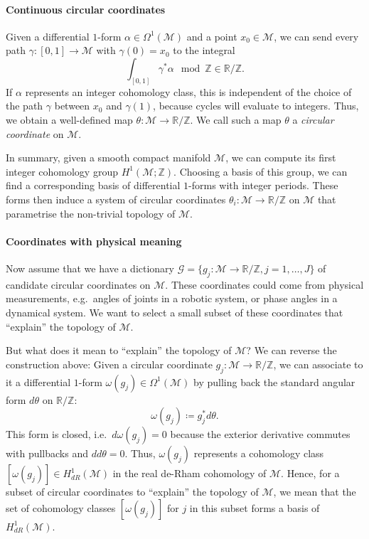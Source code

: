 \documentclass[a4paper,11pt, DIV=10]{scrartcl}
\numberwithin{equation}{section}
\theoremstyle{definition}
\theoremstyle{remark}
\newcommand{\Z}{\mathbb{Z}}
\newcommand{\R}{\mathbb{R}}
\newcommand{\mc}[1]{\mathcal{#1}}
\begin{document}
	\paragraph{Continuous circular coordinates}
	Given a differential $1$-form $\alpha\in \Omega^1(\mc{M})$ and a point $x_0\in \mc{M}$, we can send every path $\gamma\colon [0,1]\to \mc{M}$ with $\gamma(0)=x_0$ to the integral
		\begin{equation}
		\int_{[0,1]} \gamma^*\alpha \mod \Z \in \R/\Z.
		\end{equation}
	If $\alpha$ represents an integer cohomology class, this is independent of the choice of the path $\gamma$ between $x_0$ and $\gamma(1)$, because cycles will evaluate to integers.
	Thus, we obtain a well-defined map $\theta\colon \mc{M}\to \R/\Z$.
	We call such a map $\theta$ a \emph{circular coordinate} on $\mc{M}$.
	
	In summary, given a smooth compact manifold $\mc{M}$, we can compute its first integer cohomology group $H^1(\mc{M};\Z)$.
	Choosing a basis of this group, we can find a corresponding basis of differential $1$-forms with integer periods.
	These forms then induce a system of  circular coordinates $\theta_i\colon \mc{M}\to \R/\Z$ on $\mc{M}$ that parametrise the non-trivial topology of $\mc{M}$.

	\paragraph{Coordinates with physical meaning}

	Now assume that we have a dictionary $\mathcal{G}=\{g_j\colon \mc{M}\to \R/\Z, j=1,\dots, J\}$ of candidate circular coordinates on $\mc{M}$.
	These coordinates could come from physical measurements, e.g.\ angles of joints in a robotic system, or phase angles in a dynamical system.
	We want to select a small subset of these coordinates that \enquote{explain} the topology of $\mc{M}$.
	
	But what does it mean to \enquote{explain} the topology of $\mc{M}$?
	We can reverse the construction above:
	Given a circular coordinate $g_j\colon \mc{M}\to \R/\Z$, we can associate to it a differential $1$-form $\omega (g_j)\in \Omega^1(\mc{M})$ by pulling back the standard angular form $d\theta$ on $\R/\Z$:
		\begin{equation}
		\omega (g_j) \coloneq g_j^* d\theta.
		\end{equation}
	This form is closed, i.e.\ $d\omega (g_j)=0$ because the exterior derivative commutes with pullbacks and $dd\theta=0$.
	Thus, $\omega (g_j)$ represents a cohomology class $[\omega (g_j)]\in H^1_{dR}(\mc{M})$ in the real de-Rham cohomology of $\mc{M}$.
	Hence, for a subset of circular coordinates to \enquote{explain} the topology of $\mc{M}$, we mean that the set of cohomology classes $[\omega (g_j)]$ for $j$ in this subset forms a basis of $H^1_{dR}(\mc{M})$.
\end{document}
